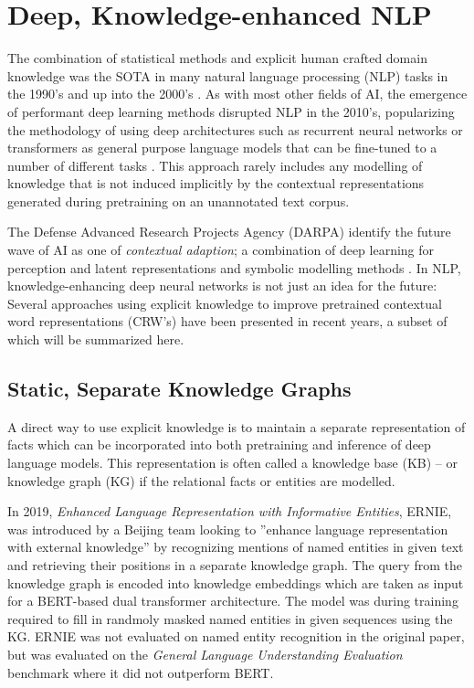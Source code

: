 \documentclass[main.tex]{subfiles}
\begin{document}
\section{Deep, Knowledge-enhanced NLP}
The combination of statistical methods and explicit human crafted domain knowledge was the SOTA in many natural language processing (NLP) tasks in the 1990's and up into the 2000's \cite[Sec. 22.5]{russell2016ai}.
As with most other fields of AI, the emergence of performant deep learning methods disrupted NLP in the 2010's, popularizing the methodology of using deep architectures such as recurrent neural networks or transformers as general purpose language models that can be fine-tuned to a number of different tasks \cite{otter18dlnlp}.
This approach rarely includes any modelling of knowledge that is not induced implicitly by the contextual representations generated during pretraining on an unannotated text corpus.

The Defense Advanced Research Projects Agency (DARPA) identify the future wave of AI as one of \emph{contextual adaption}; a combination of deep learning for perception and latent representations and symbolic modelling methods \cite{darpa17ai}.
In NLP, knowledge-enhancing deep neural networks is not just an idea for the future:
Several approaches using explicit knowledge to improve pretrained contextual word representations (CRW's) have been presented in recent years, a subset of which will be summarized here.

\subsection{Static, Separate Knowledge Graphs}
A direct way to use explicit knowledge is to maintain a separate representation of facts which can be incorporated into both pretraining and inference of deep language models.
This representation is often called a knowledge base (KB)  -- or knowledge graph (KG) if the relational facts or entities are modelled.

In 2019, \emph{Enhanced Language Representation with Informative Entities}, ERNIE, was introduced by a Beijing team \cite{zhang2019ernie} looking to ''enhance language representation  with  external  knowledge'' \cite[1]{zhang2019ernie} by recognizing mentions of named entities in given text and retrieving their positions in a separate knowledge graph.
The query from the knowledge graph is encoded into knowledge embeddings which are taken as input for a BERT-based dual transformer architecture.
The model was during training required to fill in randmoly masked named entities in given sequences using the KG.
ERNIE was not evaluated on named entity recognition in the original paper, but was evaluated on the \emph{General Language Understanding Evaluation} benchmark \cite{wang2018glue} where it did not outperform BERT.
\end{document}

